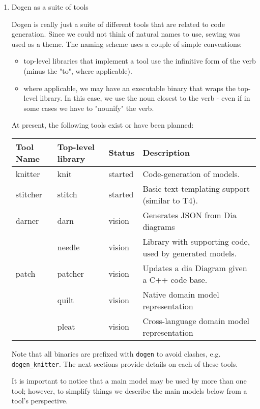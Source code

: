 \documentclass[11pt]{article}
\begin{document}
\begin{enumerate}
\item Dogen as a suite of tools
\label{sec-2-2-1-1}

Dogen is really just a suite of different tools that are related to
code generation. Since we could not think of natural names to use,
sewing was used as a theme. The naming scheme uses a couple of simple
conventions:

\begin{itemize}
\item top-level libraries that implement a tool use the infinitive form of
the verb (minus the "to", where applicable).
\item where applicable, we may have an executable binary that wraps the
top-level library. In this case, we use the noun closest to the
verb - even if in some cases we have to "nounify" the verb.
\end{itemize}

At present, the following tools exist or have been planned:

\begin{center}
\begin{tabular}{llll}
Tool Name & Top-level library & Status & Description\\
\hline
knitter & knit & started & Code-generation of models.\\
stitcher & stitch & started & Basic text-templating support (similar to T4).\\
darner & darn & vision & Generates JSON from Dia diagrams\\
 & needle & vision & Library with supporting code, used by generated models.\\
patch & patcher & vision & Updates a dia Diagram given a C++ code base.\\
 & quilt & vision & Native domain model representation\\
 & pleat & vision & Cross-language domain model representation\\
\end{tabular}
\end{center}

Note that all binaries are prefixed with \texttt{dogen} to avoid clashes,
e.g. \texttt{dogen\_knitter}. The next sections provide details on each of
these tools.

It is important to notice that a main model may be used by more than
one tool; however, to simplify things we describe the main models
below from a tool's perspective.


\end{enumerate}
\end{document}
